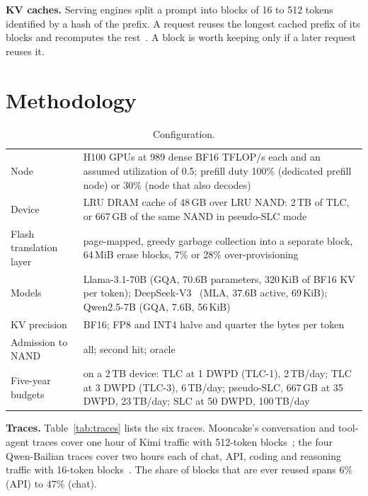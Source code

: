 \documentclass[acmsmall,screen,review]{acmart}
\begin{document}
\textbf{KV caches.} Serving engines split a prompt into blocks of 16 to 512 tokens identified by a
hash of the prefix. A request reuses the longest cached prefix of its blocks and recomputes the
rest~\cite{vllm,mooncake}. A block is worth keeping only if a later request reuses it.

\section{Methodology}
\label{sec:method}

\begin{table}[t]
\caption{Configuration.}
\label{tab:config}
\small
\begin{tabular}{@{}>{\raggedright}p{3.3cm}>{\raggedright\arraybackslash}p{10.2cm}@{}}
\toprule
Node & 8 H100 GPUs at 989 dense BF16 TFLOP/s each and an assumed utilization of 0.5; prefill duty 100\%
(dedicated prefill node) or 30\% (node that also decodes) \\
Device & LRU DRAM cache of 48\,GB over LRU NAND: 2\,TB of TLC, or 667\,GB of the same NAND in
pseudo-SLC mode \\
Flash translation layer & page-mapped, greedy garbage collection into a separate block, 64\,MiB
erase blocks, 7\% or 28\% over-provisioning \\
Models & Llama-3.1-70B (GQA, 70.6B parameters, 320\,KiB of BF16 KV per token);
DeepSeek-V3~\cite{deepseekv3} (MLA,
37.6B active, 69\,KiB); Qwen2.5-7B (GQA, 7.6B, 56\,KiB) \\
KV precision & BF16; FP8 and INT4 halve and quarter the bytes per token \\
Admission to NAND & all; second hit; oracle \\
Five-year budgets & on a 2\,TB device: TLC at 1 DWPD (TLC-1), 2\,TB/day; TLC at 3 DWPD (TLC-3),
6\,TB/day; pseudo-SLC, 667\,GB at 35 DWPD, 23\,TB/day; SLC at 50 DWPD, 100\,TB/day \\
\bottomrule
\end{tabular}
\end{table}

\textbf{Traces.} Table~\ref{tab:traces} lists the six traces. Mooncake's conversation and
tool-agent traces cover one hour of Kimi traffic with 512-token blocks~\cite{mooncake}; the four
Qwen-Bailian traces cover two hours each of chat, API, coding and reasoning traffic with 16-token
blocks~\cite{bailian}. The share of blocks that are ever reused spans 6\% (API) to 47\% (chat).

\begin{table}[t]
\caption{Production traces. Blocks reused: share of unique blocks referenced again later.}
\label{tab:traces}
\resizebox{\textwidth}{!}{}
\end{table}
\end{document}
